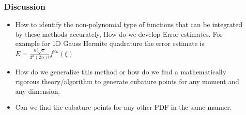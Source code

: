 \documentclass{beamer}
\begin{document}
\begin{frame}
\frametitle{Discussion}
\begin{itemize}[<+->]
\item How to identify the non-polynomial type of functions that can be integrated by these methods accurately, How do we develop Error estimates. For example for 1D Gauss Hermite quadrature the error estimate is $E=\frac{n!\sqrt{\pi}}{2^n(2n)!}f^{2n}(\xi)$ 
\item How do we generalize this method or how do we find a mathematically rigorous theory/algorithm to generate cubature points for any moment and any dimension.
\item Can we find the cubature points for any other PDF in the same manner.
\end{itemize}
\end{frame}
\end{document}
